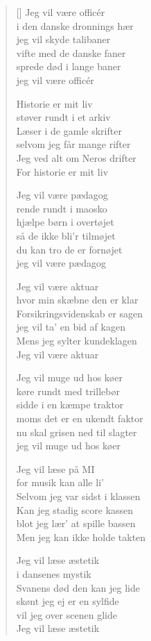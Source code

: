 \begin{multicols}
\begin{verse}[\versewidth]
Jeg vil være officér\\
i den danske dronnings hær\\
jeg vil skyde talibaner\\
vifte med de danske faner\\
sprede død i lange baner\\
jeg vil være officér


Historie er mit liv\\
støver rundt i et arkiv\\
Læser i de gamle skrifter\\
selvom jeg får mange rifter\\
Jeg ved alt om Neros drifter\\
For historie er mit liv


Jeg vil være pædagog\\
rende rundt i maosko\\
hjælpe børn i overtøjet\\
så de ikke bli'r tilmøjet\\
du kan tro de er fornøjet\\
jeg vil være pædagog


Jeg vil være aktuar\\
hvor min skæbne den er klar\\
Forsikringsvidenskab er sagen\\
jeg vil ta' en bid af kagen\\
Mens jeg sylter kundeklagen\\
Jeg vil være aktuar

Jeg vil muge ud hos køer\\
køre rundt med trillebør\\
sidde i en kæmpe traktor\\
moms det er en ukendt faktor\\
nu skal grisen ned til slagter\\
jeg vil muge ud hos køer


Jeg vil læse på MI\\
for musik kan alle li'\\
Selvom jeg var sidst i klassen\\
Kan jeg stadig score kassen\\
blot jeg lær' at spille bassen\\
Men jeg kan ikke holde takten

Jeg vil læse æstetik\\
i dansenes mystik\\
Svanens død den kan jeg lide\\
skønt jeg ej er en sylfide\\
vil jeg over scenen glide\\
Jeg vil læse æstetik


\end{verse}
\end{multicols}
